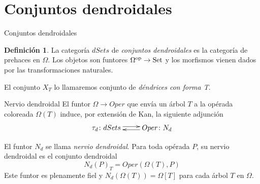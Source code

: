 \documentclass[12pt,aspectratio=169]{beamer}
\numberwithin{equation}{section}
\theoremstyle{definition}
\newtheorem{defi}[teo]{Definici\'on}
\newcommand{\Set}{\mathop{\rm Set}}
\begin{document}
\section{Conjuntos dendroidales}
\begin{frame}{Conjuntos dendroidales}
    \begin{defi}
        La categor\'ia $dSets$ de \emph{conjuntos dendroidales} es la categor\'ia de prehaces en $\Omega$. Los objetos son funtores $\Omega^{\rm op}\to\Set$ y los morfismos vienen dados por las transformaciones naturales. %
    
        
        El conjunto $X_T$ lo llamaremos conjunto de \emph{d\'endrices con forma T}. %
    
    
    \end{defi}
\end{frame}
\begin{frame}{Nervio dendroidal}
    El funtor $\Omega \to Oper$ que env\'ia un \'arbol $T$ a la op\'erada coloreada $\Omega(T)$ induce, por extensi\'on de Kan, la siguiente adjunci\'on
\[
    \xymatrix{
        \tau_d\colon dSets\ar@<0.5ex>[r] &  Oper\colon N_d \ar@<0.5ex>[l]
    }
\]

El funtor $N_d$ se llama \emph{nervio dendroidal}. Para toda op\'erada $P$, su nervio dendroidal es el conjunto dendroidal
$$
    N_d(P)_T = Oper(\Omega(T), P)
$$
Este funtor es plenamente fiel y $N_d(\Omega(T))=\Omega[T]$ para cada \'arbol $T$ en $\Omega$.
\end{frame}
\end{document}
